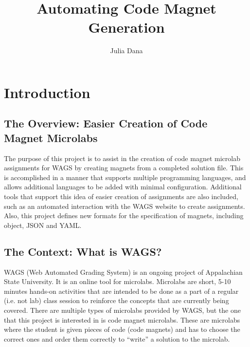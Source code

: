 \documentclass[letter,10pt]{article}
\title{Automating Code Magnet Generation}
\author{Julia Dana}
\date{}
\begin{document}
\maketitle


\pagebreak
\tableofcontents

\pagebreak

\section{Introduction}

\subsection{The Overview: Easier Creation of Code Magnet Microlabs}

The purpose of this project is to assist in the creation of code magnet 
microlab assignments for WAGS by creating magnets from a completed 
solution file. This is accomplished in a manner that supports multiple 
programming languages, and allows additional languages to be added with 
minimal configuration. Additional tools that support this idea of 
easier creation of assignments are also included, such as an automated
interaction with the WAGS website to create assignments. Also, this 
project defines new formats for the specification of magnets, including 
object, JSON and YAML. 

\subsection{The Context: What is WAGS?}

WAGS (Web Automated Grading System) is an ongoing project of 
Appalachian State University. It is an online tool for microlabs. 
Microlabs are short, 5-10 minutes hands-on activities that are 
intended to be done as a part of a regular (i.e. not lab) class session 
to reinforce the concepts that are currently being covered. There 
are multiple types of microlabs provided by WAGS, but the one that 
this project is interested in is code magnet microlabs. These are 
microlabs where the student is given pieces of code (code magnets) and 
has to choose the correct ones and order them correctly to “write” a 
solution to the microlab.

\end{document}
